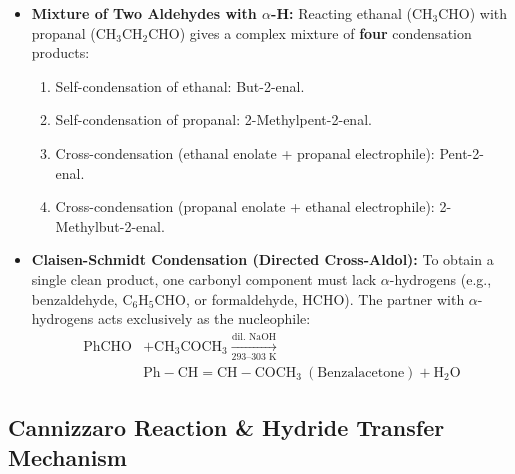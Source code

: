 \documentclass[10pt,twoside,openright]{book}
\begin{document}
\begin{trapbox}
\begin{itemize}
  \item \textbf{Mixture of Two Aldehydes with $\alpha$-H:}
  Reacting ethanal ($\mathrm{CH_3CHO}$) with propanal ($\mathrm{CH_3CH_2CHO}$) gives a complex mixture of \textbf{four} condensation products:
  \begin{enumerate}
    \item Self-condensation of ethanal: But-2-enal.
    \item Self-condensation of propanal: 2-Methylpent-2-enal.
    \item Cross-condensation (ethanal enolate + propanal electrophile): Pent-2-enal.
    \item Cross-condensation (propanal enolate + ethanal electrophile): 2-Methylbut-2-enal.
  \end{enumerate}
  \item \textbf{Claisen-Schmidt Condensation (Directed Cross-Aldol):}
  To obtain a single clean product, one carbonyl component must lack $\alpha$-hydrogens (e.g., benzaldehyde, $\mathrm{C_6H_5CHO}$, or formaldehyde, $\mathrm{HCHO}$). The partner with $\alpha$-hydrogens acts exclusively as the nucleophile:
  \begin{align}
    \mathrm{PhCHO} &+ \mathrm{CH_3COCH_3} \xrightarrow[\text{293--303 K}]{\text{dil. } \mathrm{NaOH}} \\
    &\mathrm{Ph-CH=CH-COCH_3} \ (\text{Benzalacetone}) + \mathrm{H_2O}
  \end{align}
\end{itemize}
\end{trapbox}

\subsection{Cannizzaro Reaction \& Hydride Transfer Mechanism}
\end{document}
